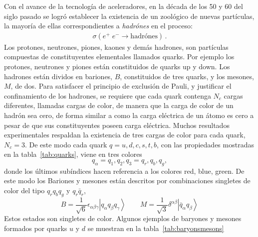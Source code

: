 Con el avance de la tecnología de aceleradores, en la década de los 50 y 60 del siglo pasado se logró establecer la existencia de un zoológico de nuevas partículas, la mayoría de ellas correspondientes a \emph{hadrónes} en el proceso:
\begin{align}
  \sigma(e^+\;e^-\rightarrow \text{hadrónes})\,.
\end{align}
Los protones, neutrones, piones, kaones y demás hadrones, son partículas compuestas de constituyentes elementales llamados quarks. Por ejemplo los protones, neutrones y piones están constituidos de quarks up y down. Los hadrones están dividos en  bariones, $B$, constituidos de tres quarks, y los mesones, $M$, de dos. Para satisfacer el principio de exclusión de Pauli, y justificar el confinamiento de los hadrones, se requiere que cada quark contenga $N_c$ cargas diferentes, llamadas cargas de color, de manera que la carga de color de un hadrón sea cero, de forma similar a como la carga eléctrica de un átomo es cero a pesar de que sus constituyentes poseen carga eléctrica. Muchos resultados experimentales respaldan la existencia de tres cargas de color para cada quark, $N_c=3$. De este modo cada quark $q=u,d,c,s,t,b$, con las propiedades mostradas en la tabla~\ref{tab:quarks}, viene en tres colores
\begin{equation}
  q_\alpha=q_1,q_2,q_3=q_r,q_b,q_g,
\end{equation}
donde los últimos subíndices hacen referencia a los colores red, blue, green. De este modo los Bariones y mesones están descritos por combinaciones singletes de color del tipo $q_r q_b q_g$ y $q_r\bar{q}_r$,
\begin{equation}
\label{eq:199qft}
  B=\frac{1}{\sqrt{6}}\epsilon_{\alpha\beta\gamma}
  \left|q_\alpha q_\beta q_\gamma\right\rangle \qquad M=\frac{1}{\sqrt{3}}\delta^{\alpha\beta}\left|\bar{q}_{\alpha}q_\beta\right\rangle
\end{equation}
Estos estados son singletes de color. Algunos ejemplos de baryones y mesones formados por quarks $u$ y $d$ se muestran en la tabla~\ref{tab:baryonsmesons}


